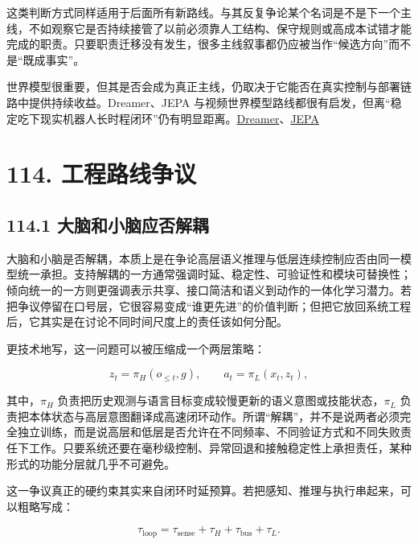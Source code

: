 这类判断方式同样适用于后面所有新路线。与其反复争论某个名词是不是下一个主线，不如观察它是否持续接管了以前必须靠人工结构、保守规则或高成本试错才能完成的职责。只要职责迁移没有发生，很多主线叙事都仍应被当作“候选方向”而不是“既成事实”。

世界模型很重要，但其是否会成为真正主线，仍取决于它能否在真实控制与部署链路中提供持续收益。Dreamer、JEPA 与视频世界模型路线都很有启发，但离“稳定吃下现实机器人长时程闭环”仍有明显距离。\href{https://arxiv.org/abs/1912.01603}{Dreamer}、\href{https://arxiv.org/abs/2301.08243}{JEPA}

\section*{114. 工程路线争议}

\subsection*{114.1 大脑和小脑应否解耦}


大脑和小脑是否解耦，本质上是在争论高层语义推理与低层连续控制应否由同一模型统一承担。支持解耦的一方通常强调时延、稳定性、可验证性和模块可替换性；倾向统一的一方则更强调表示共享、接口简洁和语义到动作的一体化学习潜力。若把争议停留在口号层，它很容易变成“谁更先进”的价值判断；但把它放回系统工程后，它其实是在讨论不同时间尺度上的责任该如何分配。

更技术地写，这一问题可以被压缩成一个两层策略：

\begingroup
\footnotesize
\begin{equation*}
z_t = \pi_H(o_{\le t}, g), \qquad a_t = \pi_L(x_t, z_t),
\end{equation*}
\endgroup

其中，\(\pi_H\) 负责把历史观测与语言目标变成较慢更新的语义意图或技能状态，\(\pi_L\) 负责把本体状态与高层意图翻译成高速闭环动作。所谓“解耦”，并不是说两者必须完全独立训练，而是说高层和低层是否允许在不同频率、不同验证方式和不同失败责任下工作。只要系统还要在毫秒级控制、异常回退和接触稳定性上承担责任，某种形式的功能分层就几乎不可避免。

这一争议真正的硬约束其实来自闭环时延预算。若把感知、推理与执行串起来，可以粗略写成：

\begingroup
\footnotesize
\begin{equation*}
\tau_{\text{loop}} = \tau_{\text{sense}} + \tau_H + \tau_{\text{bus}} + \tau_L.
\end{equation*}
\endgroup

